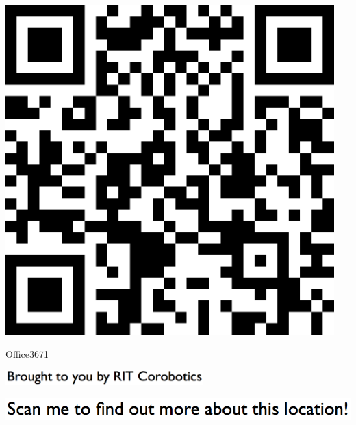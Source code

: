 \documentclass[letterpaper]{article}
\begin{document}
 \begingroup 
 \centerline{\includegraphics[scale=1,width=5in,height=5in]{Office3671.png}} 
 \endgroup 
 \vspace*{\fill} 

 \hfill{\small Office3671} 

  \vspace{0.7in} 
 
 \centerline{\includegraphics[scale=1,width=3in]{text-bottom.png}} 
 
 \pagebreak 
{} 
 \vspace*{\fill} 
 
  \centerline{\includegraphics[scale=1,width=6in]{text-top.png}} 
 
 \vspace{0.5in} 
 
\end{document}
